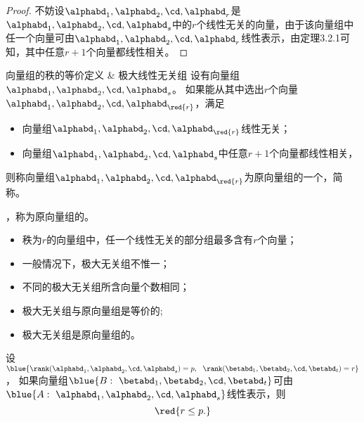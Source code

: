 \begin{proof}
不妨设$\alphabd_1,\alphabd_2,\cd,\alphabd_r$是$\alphabd_1,\alphabd_2,\cd,\alphabd_s$中的$r$个线性无关的向量，由于该向量组中任一个向量可由$\alphabd_1,\alphabd_2,\cd,\alphabd_r$线性表示，由定理3.2.1可知，其中任意$r+1$个向量都线性相关。
\end{proof}

\begin{dingyi}{向量组的秩的等价定义 \& 极大线性无关组}
  设有向量组$\alphabd_1,\alphabd_2,\cd,\alphabd_s$。
  如果能从其中选出$r$个向量$\alphabd_1,\alphabd_2,\cd,\alphabd_{\red{r}}$，满足
  \begin{itemize}
  \item 向量组$\alphabd_1,\alphabd_2,\cd,\alphabd_{\red{r}}$线性无关；
  \item 向量组$\alphabd_1,\alphabd_2,\cd,\alphabd_s$中任意$r+1$个向量都线性相关，
  \end{itemize}
  则称向量组$\alphabd_1,\alphabd_2,\cd,\alphabd_{\red{r}}$为原向量组的一个，简称。 
  \vspace{0.1in}

  ，称为原向量组的。
  
\end{dingyi}


\begin{zhu}
  \begin{itemize}
  \item   秩为$r$的向量组中，任一个线性无关的部分组最多含有$r$个向量；
  \item 一般情况下，极大无关组不惟一；
  \item 不同的极大无关组所含向量个数相同；
  \item 极大无关组与原向量组是等价的;
  \item 极大无关组是原向量组的。
  \end{itemize}

\end{zhu}

\begin{tuilun}
  设$\blue{\rank(\alphabd_1,\alphabd_2,\cd,\alphabd_s)=p,~~\rank(\betabd_1,\betabd_2,\cd,\betabd_t)=r}$，
  如果向量组$\blue{B:~\betabd_1,\betabd_2,\cd,\betabd_t}$可由$\blue{A:~\alphabd_1,\alphabd_2,\cd,\alphabd_s}$线性表示，则
  $$\red{r\le p.}$$
\end{tuilun}
 
